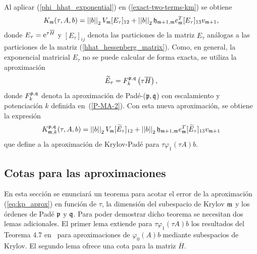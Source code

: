 Al aplicar (\ref{phi_hhat_exponential}) en (\ref{exact-two-terms-km}) se obtiene
\begin{equation*}
    K_{\mathfrak{m}}(\tau,A,b) = \left\lvert \left\lvert  b  \right\rvert \right\rvert_2V_{\mathfrak{m}} [E_\tau]_{12} + \left\lvert \left\lvert  b  \right\rvert \right\rvert_2\mathfrak{h}_{\mathfrak{m}+1,\mathfrak{m}}e^T_{\mathfrak{m}}[E_\tau]_{13}v_{\mathfrak{m}+1}, 
 \end{equation*}
 donde $E_\tau = \mathrm{e}^{\tau \overline{H} }$ y $[E_\tau]_{ij}$ denota las particiones de la matriz $E_\tau$ análogas a las particiones de la matriz (\ref{hhat_hessenberg_matrix}). Como, en general, la exponencial matricial $E_\tau$ no se puede calcular de forma exacta, se utiliza la aproximación
\begin{equation*}
    \widetilde{E}_{\tau} = F_k^{\mathfrak{p},\mathfrak{q}}\left(\tau\overline{H}\right),
\end{equation*}
donde $F_k^{\mathfrak{p},\mathfrak{q}}$ denota la aproximación de Padé-($\mathfrak{p},\mathfrak{q}$) con escalamiento y potenciación $k$ definida en~(\ref{P-MA-2}). Con esta nueva aproximación, se obtiene la expresión 
\begin{equation} \label{eq:kp_aprox}
    K_{\mathfrak{m},k}^{\mathfrak{p},\mathfrak{q}}(\tau,A,b) = \left\lvert \left\lvert  b  \right\rvert \right\rvert_2V_{\mathfrak{m}} [\widetilde{E}_\tau]_{12} + \left\lvert \left\lvert  b  \right\rvert \right\rvert_2\mathfrak{h}_{\mathfrak{m}+1,\mathfrak{m}}e^T_{\mathfrak{m}}[\widetilde{E}_\tau]_{13}v_{\mathfrak{m}+1}
 \end{equation}
 que define a la aproximación de Krylov-Padé para $\tau\varphi_1(\tau A)b$.

 \subsection{Cotas para las aproximaciones}
 En esta sección se enunciará un teorema para acotar el error de la aproximación (\ref{eq:kp_aprox}) en función de $\tau$, la dimensión del subespacio de Krylov $\mathfrak{m}$ y los órdenes de Padé $\mathfrak{p}$ y $\mathfrak{q}$. Para poder demostrar dicho teorema se necesitan dos lemas adicionales. El primer lema extiende para $\tau \varphi_1(\tau A)b$ los resultados del Teorema 4.7 en~\cite{Saad92} para aproximaciones de $\varphi_0(A)b$ mediante subespacios de Krylov. El segundo lema ofrece una cota para la matriz $\overline{H}$.

